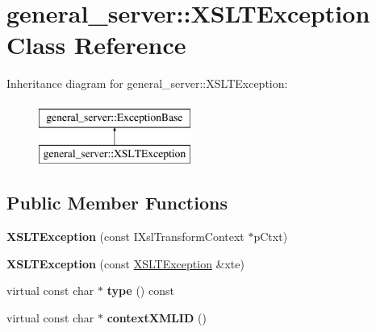 \hypertarget{classgeneral__server_1_1XSLTException}{\section{general\-\_\-server\-:\-:\-X\-S\-L\-T\-Exception \-Class \-Reference}
\label{classgeneral__server_1_1XSLTException}
}
\-Inheritance diagram for general\-\_\-server\-:\-:\-X\-S\-L\-T\-Exception\-:\begin{figure}[H]
\begin{center}
\leavevmode
\includegraphics[height=2.000000cm]{classgeneral__server_1_1XSLTException}
\end{center}
\end{figure}
\subsection*{\-Public \-Member \-Functions}
\begin{DoxyCompactItemize}
\item 
\hypertarget{classgeneral__server_1_1XSLTException_aa2a457b521f615f7f50a38c6cd7aa4e3}{{\bfseries \-X\-S\-L\-T\-Exception} (const \-I\-Xsl\-Transform\-Context $\ast$p\-Ctxt)}\label{classgeneral__server_1_1XSLTException_aa2a457b521f615f7f50a38c6cd7aa4e3}

\item 
\hypertarget{classgeneral__server_1_1XSLTException_a9519bd6fb834a8ce379c173e167561b6}{{\bfseries \-X\-S\-L\-T\-Exception} (const \hyperlink{classgeneral__server_1_1XSLTException}{\-X\-S\-L\-T\-Exception} \&xte)}\label{classgeneral__server_1_1XSLTException_a9519bd6fb834a8ce379c173e167561b6}

\item 
\hypertarget{classgeneral__server_1_1XSLTException_a828264ddee784484831245d298e75250}{virtual const char $\ast$ {\bfseries type} () const }\label{classgeneral__server_1_1XSLTException_a828264ddee784484831245d298e75250}

\item 
\hypertarget{classgeneral__server_1_1XSLTException_ad8c78831c7d85401720316f6f04878b4}{virtual const char $\ast$ {\bfseries context\-X\-M\-L\-I\-D} ()}\label{classgeneral__server_1_1XSLTException_ad8c78831c7d85401720316f6f04878b4}

\end{DoxyCompactItemize}
